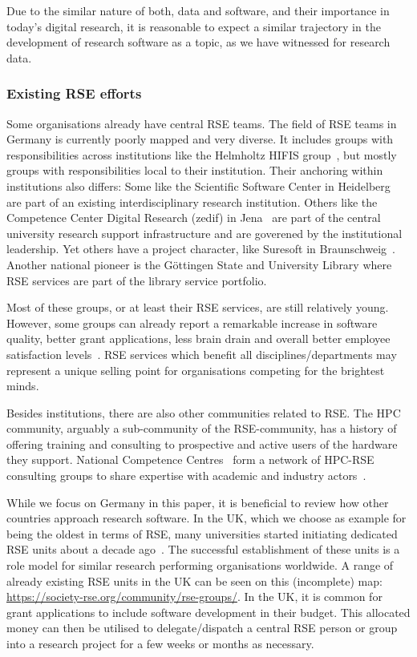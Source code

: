 \documentclass[a4paper]{article}
\begin{document}
Due to the similar nature of both, data and software, and their importance in today's digital research, it is reasonable to expect a similar trajectory in the development of research software as a topic, as we have witnessed for research data.

\subsubsection{Existing RSE efforts}
Some organisations already have central RSE teams.
The field of RSE teams in Germany is currently poorly mapped and very diverse.
It includes groups with responsibilities across institutions like
 the Helmholtz HIFIS group~\autocite{haupt_hifis_consulting_2021, HIFIS},
 but mostly groups with responsibilities local to their institution.
Their anchoring within institutions also differs:
Some like the Scientific Software Center in Heidelberg~\autocite{keegan_ssc_whitepaper,HeidelbergSSC} are part of an existing interdisciplinary research institution.
Others like the Competence Center Digital Research (zedif) in Jena~\autocite{zedifUniJena} are part of the central university research support infrastructure and are goverened by the institutional leadership.
Yet others have a project character, like Suresoft in Braunschweig~\autocite{Blech2022,SURESOFTLink}.
Another national pioneer is the Göttingen State and University Library where RSE services are part of the library service portfolio.

Most of these groups, or at least their RSE services, are still relatively young.
However, some groups can already report a remarkable increase in software quality, better grant applications, less brain drain and overall better employee satisfaction levels~\autocite{schimavoigt2023}.
RSE services which benefit all disciplines/departments may represent a unique selling point for organisations competing for the brightest minds.

Besides institutions, there are also other communities related to RSE\@.
The HPC community, arguably a sub-community of the RSE-community,
has a history of offering training and consulting to prospective and active users of the hardware they support.
National Competence Centres~\autocite{EuroCCWeb} form a network of HPC-RSE consulting groups to share expertise with academic and industry actors~\autocite{eurocc_success_stories_2023,eurocc_success_stories_2024}.

While we focus on Germany in this paper, it is beneficial to review how other countries approach research software.
In the UK, which we choose as example for being the oldest in terms of RSE, many universities started initiating dedicated RSE units about a decade ago~\autocite{Crouch2013, KDL}.
The successful establishment of these units is a role model for similar research performing organisations worldwide.
A range of already existing RSE units in the UK can be seen on this (incomplete) map: \url{https://society-rse.org/community/rse-groups/}.
In the UK, it is common for grant applications to include software development in their budget.
This allocated money can then be utilised to delegate/dispatch a central RSE person or group into a research project for a few weeks or months as necessary.
\end{document}

